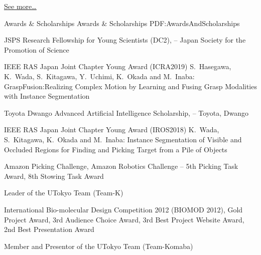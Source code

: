 \documentclass[letterpaper,MMMyyyy,nonstopmode]{simpleresumecv}
\begin{document}
\begin{Body}
\hfill
\href{https://scholar.google.com/citations?user=deAeiIkAAAAJ}{\underline{See more…}}

\endgroup


\Section
{Awards \&\newline
Scholarships}
{Awards \& Scholarships}
{PDF:AwardsAndScholarships}

\BulletItem
JSPS Research Fellowship for Young Scientists (DC2),
\hfill
{} --
\newline
Japan Society for the Promotion of Science

 IEEE RAS Japan Joint Chapter Young Award (ICRA2019)
\hfill
{}
\newline
S.~Hasegawa, K.~Wada, S.~Kitagawa, Y.~Uchimi, K.~Okada and M.~Inaba:
GraspFusion:Realizing Complex Motion by Learning and Fusing Grasp Modalities with Instance Segmentation

\BulletItem
Toyota Dwango Advanced Artificial Intelligence Scholarship,
\hfill
{} --
\newline
Toyota, Dwango

 IEEE RAS Japan Joint Chapter Young Award (IROS2018)
\hfill
{}
\newline
K.~Wada, S.~Kitagawa, K.~Okada and M.~Inaba: Instance Segmentation of Visible and
Occluded Regions for Finding and Picking Target from a Pile of Objects

\BulletItem
Amazon Picking Challenge, Amazon Robotics Challenge
\hfill
{} --
\newline
5th Picking Task Award, 8th Stowing Task Award
\begin{Detail}
\Item
Leader of the UTokyo Team (Team-K)
\end{Detail}

\BulletItem
International Bio-molecular Design Competition 2012 (BIOMOD 2012),
\hfill
{}
\newline
Gold Project Award, 3rd Audience Choice Award, 3rd Best Project Website Award, 2nd Best Presentation Award
\begin{Detail}
\Item
Member and Presentor of the UTokyo Team (Team-Komaba)
\end{Detail}

\Gap



\end{Body}
\end{document}
